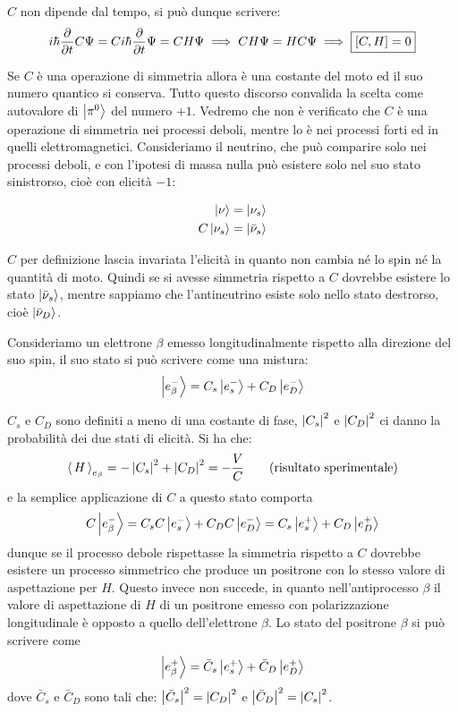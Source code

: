 $C$ non dipende dal tempo, si può dunque scrivere:
\begin{equation*}
 i\hbar \dfrac{\partial}{\partial t} C \Psi = C i \hbar \dfrac{\partial}{\partial t} \Psi = C H \Psi \implies C H \Psi = H C \Psi \implies \fbox{$[C, H] = 0$}
\end{equation*}

Se $C$ è una operazione di simmetria allora è una costante del moto ed il suo
numero quantico si conserva.
Tutto questo discorso convalida la scelta come autovalore di $\Ket{\pi^0}$ del
numero $+1$.
Vedremo che non è verificato che $C$ è una operazione di simmetria nei processi
deboli, mentre lo è nei processi forti ed in quelli elettromagnetici.
Consideriamo il neutrino, che può comparire solo nei processi deboli, e con
l'ipotesi di massa nulla può esistere solo nel suo stato sinistrorso, cioè con
elicità $-1$:

\begin{align*}
\Ket{\nu} &= \Ket{\nu_s} \\
C \Ket{\nu_s} &= \Ket{\bar{\nu}_s}
\end{align*}

$C$ per definizione lascia invariata l'elicità in quanto non cambia né lo spin
né la quantità di moto. Quindi se si avesse simmetria rispetto a $C$ dovrebbe
esistere lo stato $\Ket{\bar{\nu}_s}$, mentre sappiamo che l'antineutrino
esiste solo nello stato destrorso, cioè $\Ket{\bar{\nu}_D}$.

Consideriamo un elettrone $\beta$ emesso longitudinalmente rispetto alla
direzione del suo spin, il suo stato si può scrivere come una
mistura:
\begin{equation*}
\Ket{e^-_\beta} = C_s \Ket{e^-_s} + C_D \Ket{e^-_D}
\end{equation*}

$C_s$ e $C_D$ sono definiti a meno di una costante di fase, $\left| C_s \right|^2$ e
$\left| C_D \right|^2$ ci danno la probabilità dei due stati di elicità. Si ha che:
\begin{equation*}
  \left\langle\, H \,\right\rangle_{e_{\beta}} = - \left| C_s \right|^2 + \left| C_D \right|^2 = - \frac{V}{C} \qquad \text{(risultato sperimentale)}
\end{equation*}
e la semplice applicazione di $C$ a questo stato comporta
\begin{equation*}
C\Ket{e^-_\beta} = C_s C \Ket{e^-_s} + C_D C \Ket{e^-_D} = C_s \Ket{e^+_s} + C_D\Ket{e^+_D}
\end{equation*}
dunque se il processo debole rispettasse la simmetria rispetto a $C$ dovrebbe
esistere un processo simmetrico che produce un positrone con lo stesso valore di
aspettazione per $H$.  Questo invece non
succede, in quanto nell'antiprocesso $\beta$ il valore di aspettazione di $H$ di
un positrone emesso con polarizzazione longitudinale è opposto a quello
dell'elettrone $\beta$. Lo stato del positrone $\beta$ si può scrivere come
\begin{equation*}
\Ket{e^+_\beta} = \bar{C}_s \Ket{e^+_s} + \bar{C}_D \Ket{e^+_D}
\end{equation*}
dove $\bar{C}_s$ e $\bar{C}_D$ sono tali che: $\left| \bar{C}_s \right|^2 = \left| C_D \right|^2$
e $\left| \bar{C}_D \right|^2 = \left| C_s \right|^2$.

